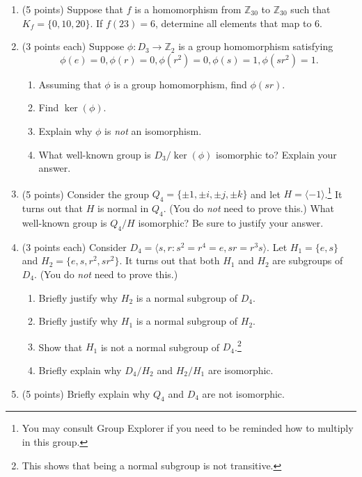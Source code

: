 \documentclass[11pt]{article}
\theoremstyle{definition}
\begin{document}
\begin{enumerate}

\item (5 points) Suppose that $f$ is a homomorphism from $\mathbb{Z}_{30}$ to $\mathbb{Z}_{30}$ such that $K_f=\{0,10,20\}$.  If $f(23)=6$, determine all elements that map to 6.

\item (3 points each)  Suppose $\phi: D_{3}\to \mathbb{Z}_{2}$ is a group homomorphism satisfying 
\[
\phi(e)=0, \phi(r)=0, \phi(r^2)=0, \phi(s)=1, \phi(sr^2)=1.
\]

\begin{enumerate}

\item Assuming that $\phi$ is a group homomorphism, find $\phi(sr)$.

\item Find $\ker(\phi)$.

\item Explain why $\phi$ is \emph{not} an isomorphism.

\item What well-known group is $D_{3}/\ker(\phi)$ isomorphic to?  Explain your answer.

\end{enumerate}

\item (5 points)  Consider the group $Q_4=\{\pm 1, \pm i, \pm j, \pm k\}$ and let $H=\langle -1 \rangle$.\footnote{You may consult Group Explorer if you need to be reminded how to multiply in this group.}  It turns out that $H$ is normal in $Q_4$.  (You do \emph{not} need to prove this.)  What well-known group is $Q_4/H$ isomorphic?  Be sure to justify your answer.

\item (3 points each) Consider $D_4=\langle s, r: s^2=r^4=e, sr=r^3s\rangle$.  Let $H_1=\{e,s\}$ and $H_2=\{e,s,r^2, sr^2\}$.  It turns out that both $H_1$ and $H_2$ are subgroups of $D_4$.  (You do \emph{not} need to prove this.)

\begin{enumerate}
\item Briefly justify why $H_2$ is a normal subgroup of $D_4$.

\item Briefly justify why $H_1$ is a normal subgroup of $H_2$.

\item Show that $H_1$ is not a normal subgroup of $D_4$.\footnote{This shows that being a normal subgroup is not transitive.}

\item Briefly explain why $D_4/H_2$ and $H_2/H_1$ are isomorphic.
\end{enumerate}

\item (5 points)  Briefly explain why $Q_4$ and $D_4$ are not isomorphic.

\end{enumerate}
\end{document}
